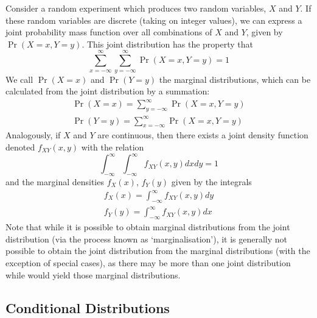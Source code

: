 \documentclass[11pt]{report} %
\begin{document}
Consider a random experiment which produces two random variables, $X$ and $Y$. If these random variables are discrete (taking on integer values), we can express a joint probability mass function over all combinations of $X$ and $Y$, given by $\operatorname{Pr}\left(X = x, Y = y\right)$. This joint distribution has the property that
\begin{equation}
\sum_{x = -\infty}^{\infty}\sum_{y = -\infty}^{\infty}\operatorname{Pr}\left(X = x, Y = y\right) = 1
\end{equation}
We call $\operatorname{Pr}\left(X = x\right)$ and $\operatorname{Pr}\left(Y = y\right)$ the marginal distributions, which can be calculated from the joint distribution by a summation:
\begin{gather}
\operatorname{Pr}\left(X = x\right) = \sum_{y = -\infty}^{\infty}\operatorname{Pr}\left(X = x, Y = y\right) \\
\operatorname{Pr}\left(Y = y\right) = \sum_{x = -\infty}^{\infty}\operatorname{Pr}\left(X = x, Y = y\right)
\end{gather}
Analogously, if $X$ and $Y$ are continuous, then there exists a joint density function denoted $f_{XY}\left(x, y\right)$ with the relation
\begin{equation}
\int_{-\infty}^{\infty}\int_{-\infty}^{\infty}f_{XY}\left(x, y\right)dxdy = 1
\end{equation}
and the marginal densities $f_{X}\left(x\right)$, $f_{Y}\left(y\right)$ given by the integrals
\begin{gather}
f_{X}\left(x\right) = \int_{-\infty}^{\infty}f_{XY}\left(x, y\right)dy \\
f_{Y}\left(y\right) = \int_{-\infty}^{\infty}f_{XY}\left(x, y\right)dx
\end{gather}
Note that while it is possible to obtain marginal distributions from the joint distribution (via the process known as `marginalisation'), it is generally not possible to obtain the joint distribution from the marginal distributions (with the exception of special cases), as there may be more than one joint distribution while would yield those marginal distributions.

\subsection{Conditional Distributions}
\end{document}
